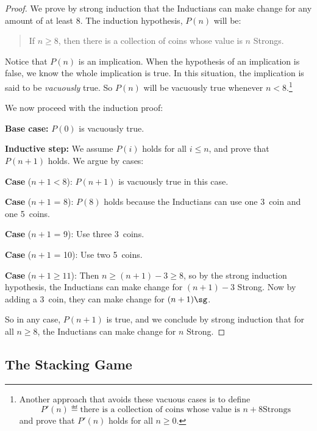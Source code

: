 \begin{proof}

  We prove by strong induction that the Inductians can make change for any
  amount of at least 8\sg.  The induction hypothesis, $P(n)$ will be:
\begin{quote}
If $n \geq 8$, then there is a collection of coins whose value is $n$
Strongs.
\end{quote}

Notice that $P(n)$ is an implication.  When the hypothesis of an
implication is false, we know the whole implication is true.  In this
situation, the implication is said to be \emph{vacuously} true.  So $P(n)$
will be vacuously true whenever $n < 8$.\footnote{Another approach that
avoids these vacuous cases is to define
\[
P'(n) \eqdef \text{there is a collection of coins whose value is $n+8$
Strongs}
\]
and prove that $P'(n)$ holds for all $n \geq 0$.
\iffalse
The solution to
\href{http://courses.csail.mit.edu/6.042/spring06/solutions/cp3fsol.pdf}
{Class Problem 1 from Spring '06, Friday, Feb. 24} uses this approach.\fi
}

We now proceed with the induction proof:

\textbf{Base case:} $P(0)$ is vacuously true.

\textbf{Inductive step:}  We assume $P(i)$ holds for all $i \leq n$, and
prove that $P(n+1)$ holds.  We argue by cases:

\textbf{Case} ($n+1 < 8$): $P(n+1)$ is vacuously true in this case.

\textbf{Case} ($n+1$ = 8): $P(8)$ holds because the Inductians can use one
3\sg\ coin and one 5\sg\ coins.

\textbf{Case} ($n+1$ = 9): Use three 3\sg\ coins.

\textbf{Case} ($n+1$ = 10): Use two 5\sg\ coins.

\textbf{Case} ($n+1 \geq 11$): Then $n \geq (n+1) -3 \geq 8$, so by the
strong induction hypothesis, the Inductians can make change for $(n+1)-3$
Strong.  Now by adding a 3\sg\ coin, they can make change for $(n+1)\sg$.

So in any case, $P(n+1)$ is true, and we conclude by strong induction that
for all $n \geq 8$, the Inductians can make change for $n$ Strong.

\end{proof}

\subsection{The Stacking Game}

